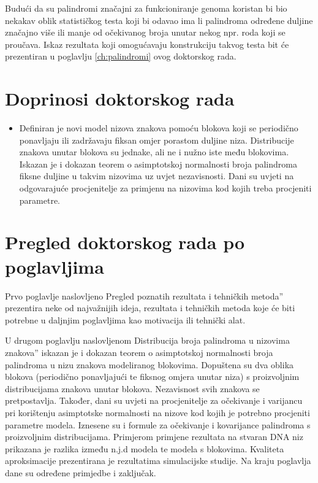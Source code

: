 Budući da su palindromi značajni za funkcioniranje genoma
koristan bi bio nekakav oblik statističkog testa koji bi
odavao ima li palindroma određene duljine značajno više ili manje
od očekivanog broja unutar nekog npr. roda koji se proučava.
Iskaz rezultata koji omogućavaju konstrukciju takvog testa
bit će prezentiran u poglavlju \ref{ch:palindromi} ovog doktorskog rada.


\section*{Doprinosi doktorskog rada}

\begin{itemize}[label=$\bullet$]
	\item{
		Definiran je novi model nizova znakova pomoću
		blokova koji se periodično ponavljaju ili 
		zadržavaju fiksan omjer porastom duljine niza.
		Distribucije znakova unutar blokova su
		jednake, ali ne i nužno iste među blokovima.
		Iskazan je i dokazan teorem o asimptotskoj
		normalnosti broja palindroma fiksne duljine
		u takvim nizovima uz uvjet nezavisnosti.
		Dani su uvjeti na 
		odgovarajuće procjenitelje
		za primjenu na nizovima
		kod kojih treba procjeniti parametre.
	}
\end{itemize}

\section*{Pregled doktorskog rada po poglavljima}

Prvo poglavlje naslovljeno {\glqq}Pregled poznatih rezultata
i tehničkih metoda'' prezentira neke od najvažnijih
ideja, rezultata i tehničkih metoda koje će biti
potrebne u daljnjim poglavljima kao motivacija
ili tehnički alat. 

U drugom poglavlju  naslovljenom
{\glqq}Distribucija broja palindroma u nizovima znakova''
iskazan je i dokazan teorem o asimptotskoj normalnosti
broja palindroma u nizu znakova modeliranog blokovima.
Dopuštena su dva oblika blokova (periodično ponavljajući
te fiksnog omjera unutar niza) s proizvoljnim
distribucijama znakova unutar blokova.
Nezavisnost svih znakova se pretpostavlja.
Također, dani su uvjeti na procjenitelje za
očekivanje i varijancu pri korištenju asimptotske
normalnosti na nizove kod kojih je potrebno procjeniti
parametre modela. Iznesene su i formule 
za očekivanje i kovarijance palindroma s
proizvoljnim distribucijama. Primjerom primjene
rezultata na stvaran DNA niz prikazana je 
razlika između n.j.d modela te modela s blokovima.
Kvaliteta aproksimacije prezentirana je rezultatima
simulacijske studije.
Na kraju poglavlja dane su određene
primjedbe i zaključak.

